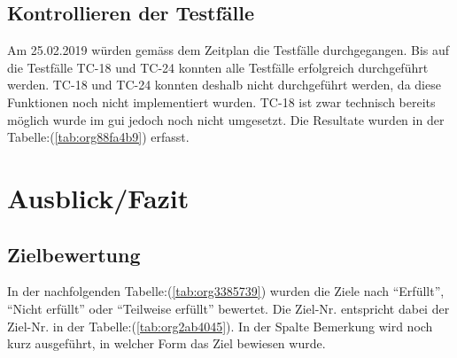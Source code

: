 \subsection{Kontrollieren der Testfälle}
\label{sec:orgc9c6334}

Am 25.02.2019 würden gemäss dem Zeitplan die Testfälle durchgegangen. Bis auf
die Testfälle TC-18 und TC-24 konnten alle Testfälle erfolgreich durchgeführt
werden. TC-18 und TC-24 konnten deshalb nicht durchgeführt werden, da diese
Funktionen noch nicht implementiert wurden. TC-18 ist zwar technisch bereits
möglich wurde im \gls{gui} jedoch noch nicht umgesetzt. Die Resultate wurden in
der Tabelle:(\ref{tab:org88fa4b9}) erfasst.

\section{Ausblick/Fazit}
\label{sec:org859a9c9}
\subsection{Zielbewertung}
\label{sec:orge97ea77}

In der nachfolgenden Tabelle:(\ref{tab:org3385739}) wurden die Ziele nach
"`Erfüllt"', "`Nicht erfüllt"' oder "`Teilweise erfüllt"' bewertet. Die Ziel-Nr.
entspricht dabei der Ziel-Nr. in der Tabelle:(\ref{tab:org2ab4045}). In der Spalte
Bemerkung wird noch kurz ausgeführt, in welcher Form das Ziel bewiesen wurde.

